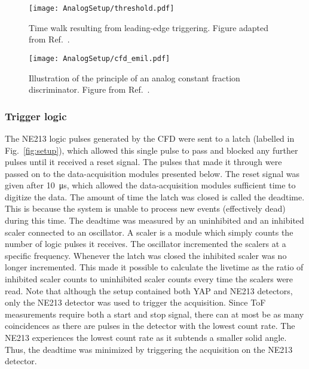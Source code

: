 \documentclass[main.tex]{subfiles}
\begin{document}
\begin{figure}[h]
    \centering
        \texttt{[image: AnalogSetup/threshold.pdf]}
        \caption[Time walk resulting from leading edge triggering]{Time walk resulting from leading-edge triggering. Figure adapted from Ref.~\cite{rofors}.}
    \label{fig:discriminator}
\end{figure}

\begin{figure}[h]
    \centering
        \texttt{[image: AnalogSetup/cfd\_emil.pdf]}
        \caption[CFD trigger principle]{Illustration of the principle of an analog constant fraction discriminator. Figure from Ref.~\cite{rofors}.}
    \label{fig:cfd}
\end{figure}



\subsubsection{Trigger logic}
The NE213 logic pulses generated by the CFD were sent to a latch (labelled  in Fig.~\ref{fig:setup}), which allowed this single pulse to pass and blocked any further pulses until it received a reset signal. The pulses that made it through were passed on to the data-acquisition modules presented below. The reset signal was given after \SI{10}{\micro\second}, which allowed the data-acquisition modules sufficient time to digitize the data. The amount of time the latch was closed is called the deadtime. This is because the system is unable to process new events (effectively dead) during this time. The deadtime was measured by an uninhibited and an inhibited scaler connected to an oscillator. A scaler is a module which simply counts the number of logic pulses it receives. The oscillator incremented the scalers at a specific frequency. Whenever the latch was closed the inhibited scaler was no longer incremented. This made it possible to calculate the livetime as the ratio of inhibited scaler counts to uninhibited scaler counts every time the scalers were read. Note that although the setup contained both YAP and NE213 detectors, only the NE213 detector was used to trigger the acquisition. Since ToF measurements require both a start and stop signal, there can at most be as many coincidences as there are pulses in the detector with the lowest count rate. The NE213 experiences the lowest count rate as it subtends a smaller solid angle. Thus, the deadtime was minimized by triggering the acquisition on the NE213 detector.
\end{document}
